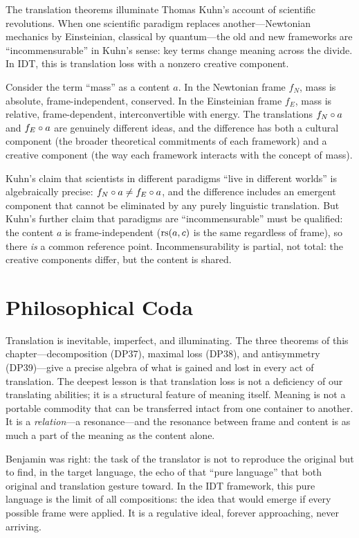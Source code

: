 The translation theorems illuminate Thomas Kuhn's account of scientific
revolutions.  When one scientific paradigm replaces another---Newtonian
mechanics by Einsteinian, classical by quantum---the old and new frameworks
are ``incommensurable'' in Kuhn's sense: key terms change meaning across the
divide.  In IDT, this is translation loss with a nonzero creative component.

Consider the term ``mass'' as a content $a$.  In the Newtonian frame $f_N$,
mass is absolute, frame-independent, conserved.  In the Einsteinian frame
$f_E$, mass is relative, frame-dependent, interconvertible with energy.  The
translations $f_N \circ a$ and $f_E \circ a$ are genuinely different
ideas, and the difference has both a cultural component (the broader
theoretical commitments of each framework) and a creative component (the
way each framework interacts with the concept of mass).

Kuhn's claim that scientists in different paradigms ``live in different
worlds'' is algebraically precise: $f_N \circ a \neq f_E \circ a$,
and the difference includes an emergent component that cannot be eliminated
by any purely linguistic translation.  But Kuhn's further claim that
paradigms are ``incommensurable'' must be qualified: the content $a$ is
frame-independent ($\mathrm{rs}(a, c)$ is the same regardless of frame), so there
\emph{is} a common reference point.  Incommensurability is partial, not
total: the creative components differ, but the content is shared.

\section{Philosophical Coda}

Translation is inevitable, imperfect, and illuminating.  The three theorems
of this chapter---decomposition (DP37), maximal loss (DP38), and antisymmetry
(DP39)---give a precise algebra of what is gained and lost in every act of
translation.  The deepest lesson is that translation loss is not a deficiency
of our translating abilities; it is a structural feature of meaning itself.
Meaning is not a portable commodity that can be transferred intact from one
container to another.  It is a \emph{relation}---a resonance---and the
resonance between frame and content is as much a part of the meaning as the
content alone.

Benjamin was right: the task of the translator is not to reproduce the original
but to find, in the target language, the echo of that ``pure language'' that
both original and translation gesture toward.  In the IDT framework, this
pure language is the limit of all compositions: the idea that would emerge if
every possible frame were applied.  It is a regulative ideal, forever
approaching, never arriving.

